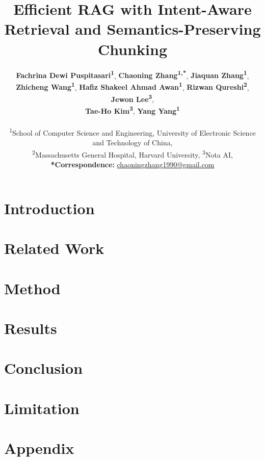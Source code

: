 \documentclass[11pt]{article}
\title{Efficient RAG with Intent-Aware Retrieval and Semantics-Preserving Chunking}
\author{
 \textbf{Fachrina Dewi Puspitasari\textsuperscript{1}},
 \textbf{Chaoning Zhang\textsuperscript{1,*}},
 \textbf{Jiaquan Zhang\textsuperscript{1}},\\
 \textbf{Zhicheng Wang\textsuperscript{1}},
 \textbf{Hafiz Shakeel Ahmad Awan\textsuperscript{1}},
 \textbf{Rizwan Qureshi\textsuperscript{2}},
 \textbf{Jewon Lee\textsuperscript{3}},\\
 \textbf{Tae-Ho Kim\textsuperscript{3}},
 \textbf{Yang Yang\textsuperscript{1}}
\\
\\
 \textsuperscript{1}School of Computer Science and Engineering, University of Electronic Science and Technology of China,\\
 \textsuperscript{2}Massachusetts General Hospital, Harvard University,
 \textsuperscript{3}Nota AI,\\
 \small{
   \textbf{*Correspondence:} \href{mailto:chaoningzhang1990@gmail.com}{chaoningzhang1990@gmail.com}
 }
}
\begin{document}
\maketitle
\begin{abstract}

\end{abstract}

\section{Introduction}


\section{Related Work}


\section{Method}


\section{Results}


\section{Conclusion}


\section{Limitation}




%



\clearpage

\appendix

\section{Appendix}\label{sec:appendix}
\setcounter{table}{0}
\renewcommand{\thetable}{A\arabic{table}}




\end{document}
